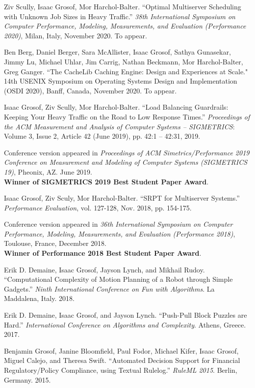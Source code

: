 \documentclass{res}
\begin{document}
\begin{resume}
    Ziv Scully, Isaac Grosof, Mor Harchol-Balter.
    ``Optimal Multiserver Scheduling with Unknown Job Sizes in Heavy Traffic.''
    \textit{38th International Symposium on Computer Performance, Modeling, Measurements, and Evaluation (Performance 2020)},
    Milan, Italy, November 2020. To appear.

	Ben Berg, Daniel Berger, Sara McAllister, Isaac Grosof, Sathya Gunasekar, Jimmy Lu, Michael Uhlar,
	Jim Carrig, Nathan Beckmann, Mor Harchol-Balter, Greg Ganger.
	``The CacheLib Caching Engine: Design and Experiences at Scale."
	14th USENIX Symposium on Operating Systems Design and Implementation (OSDI 2020),
	Banff, Canada, November 2020. To appear.

    Isaac Grosof, Ziv Scully, Mor Harchol-Balter.
    ``Load Balancing Guardrails: Keeping Your Heavy Traffic on the Road to Low Response Times.''
    \textit{Proceedings of the ACM Measurement and Analysis of Computer Systems -- SIGMETRICS}:
    Volume 3, Issue 2, Article 42 (June 2019), pp. 42:1 -- 42:31, 2019.

    Conference version appeared in \textit{Proceedings of ACM Simetrics/Performance 2019
    Conference on Measurement and Modeling of Computer Systems (SIGMETRICS 19)}, Pheonix, AZ.
    June 2019.\\
    \textbf{Winner of SIGMETRICS 2019 Best Student Paper Award}.

    Isaac Grosof, Ziv Sculy, Mor Harchol-Balter.
    ``SRPT for Multiserver Systems.''
    \textit{Performance Evaluation}, vol. 127-128, Nov. 2018, pp. 154-175.

    Conference version appeared in \textit{36th International Symposium on Computer Performance, Modeling, Measurements, and Evaluation (Performance 2018)}, Toulouse, France, December 2018. \\
    \textbf{Winner of Performance 2018 Best Student Paper Award}.

    Erik D. Demaine, Isaac Grosof, Jayson Lynch, and Mikhail Rudoy.
    ``Computational Complexity of Motion Planning of a Robot through Simple Gadgets.''
    \textit{Ninth International Conference on Fun with Algorithms}. La Maddalena, Italy. 2018.

    Erik D. Demaine, Isaac Grosof, and Jayson Lynch.
    ``Push-Pull Block Puzzles are Hard.''
    \textit{International Conference on Algorithms and Complexity}. Athens, Greece. 2017.

    Benjamin Grosof, Janine Bloomfield, Paul Fodor, Michael Kifer, Isaac Grosof, Miguel Calejo, and Theresa Swift.
    ``Automated Decision Support for Financial Regulatory/Policy Compliance, using Textual Rulelog.'' \textit{RuleML 2015}. Berlin, Germany. 2015.


\end{resume}
\end{document}
